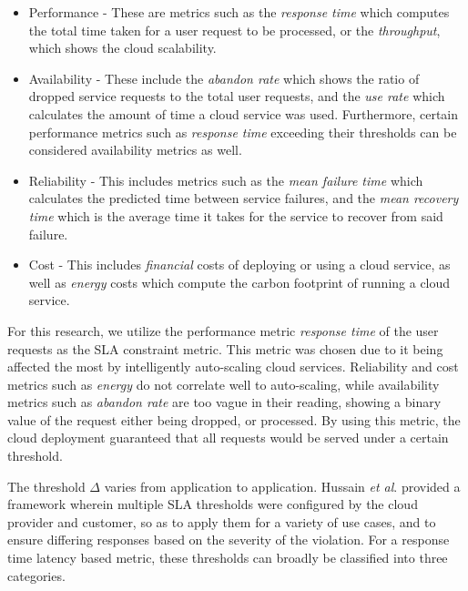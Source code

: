 \begin{itemize}
    \item Performance - These are metrics such as the \textit{response time} which computes the total time taken for a user request to be processed, or the \textit{throughput}, which shows the cloud scalability.
    \item Availability - These include the \textit{abandon rate} which shows the ratio of dropped service requests to the total user requests, and the \textit{use rate} which calculates the amount of time a cloud service was used. Furthermore, certain performance metrics such as \textit{response time} exceeding their thresholds can be considered availability metrics as well.
    \item Reliability - This includes metrics such as the \textit{mean failure time} which calculates the predicted time between service failures, and the \textit{mean recovery time} which is the average time it takes for the service to recover from said failure.
    \item Cost - This includes \textit{financial} costs of deploying or using a cloud service, as well as \textit{energy} costs which compute the carbon footprint of running a cloud service.
\end{itemize}

For this research, we utilize the performance metric \textit{response time} of the user requests as the SLA constraint metric. This metric was chosen due to it being affected the most by intelligently auto-scaling cloud services. Reliability and cost metrics such as \textit{energy} do not correlate well to auto-scaling, while availability metrics such as \textit{abandon rate} are too vague in their reading, showing a binary value of the request either being dropped, or processed. By using this metric, the cloud deployment guaranteed that all requests would be served under a certain threshold.

The threshold $\Delta$ varies from application to application. Hussain \textit{et al}. \cite{hussain2016sla} provided a framework wherein multiple SLA thresholds were configured by the cloud provider and customer, so as to apply them for a variety of use cases, and to ensure differing responses based on the severity of the violation. For a response time latency based metric, these thresholds can broadly be classified into three categories.

